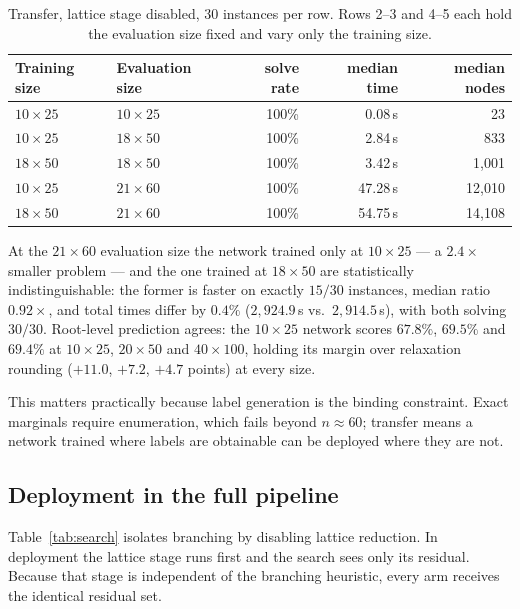 \documentclass[11pt]{article}
\begin{document}
\begin{table}[h]
\centering
\begin{tabular}{llrrr}
\toprule
Training size & Evaluation size & solve rate & median time & median nodes \\
\midrule
$10\times25$ & $10\times25$ & 100\% & 0.08\,s & 23 \\
$10\times25$ & $18\times50$ & 100\% & 2.84\,s & 833 \\
$18\times50$ & $18\times50$ & 100\% & 3.42\,s & 1{,}001 \\
$10\times25$ & $21\times60$ & 100\% & 47.28\,s & 12{,}010 \\
$18\times50$ & $21\times60$ & 100\% & 54.75\,s & 14{,}108 \\
\bottomrule
\end{tabular}
\caption{Transfer, lattice stage disabled, $30$ instances per row. Rows 2--3 and 4--5 each hold the evaluation size fixed and vary only the training size.}
\label{tab:transfer}
\end{table}

At the $21\times60$ evaluation size the network trained only at $10\times25$ --- a $2.4\times$ smaller problem --- and the one trained at $18\times50$ are statistically indistinguishable: the former is faster on exactly $15/30$ instances, median ratio $0.92\times$, and total times differ by $0.4\%$ ($2{,}924.9$\,s vs.\ $2{,}914.5$\,s), with both solving $30/30$. Root-level prediction agrees: the $10\times25$ network scores $67.8\%$, $69.5\%$ and $69.4\%$ at $10\times25$, $20\times50$ and $40\times100$, holding its margin over relaxation rounding ($+11.0$, $+7.2$, $+4.7$ points) at every size.

This matters practically because label generation is the binding constraint. Exact marginals require enumeration, which fails beyond $n\approx60$; transfer means a network trained where labels are obtainable can be deployed where they are not.

\subsection{Deployment in the full pipeline}
\label{sec:exp-cascade}

Table~\ref{tab:search} isolates branching by disabling lattice reduction. In deployment the lattice stage runs first and the search sees only its residual. Because that stage is independent of the branching heuristic, every arm receives the identical residual set.
\end{document}
